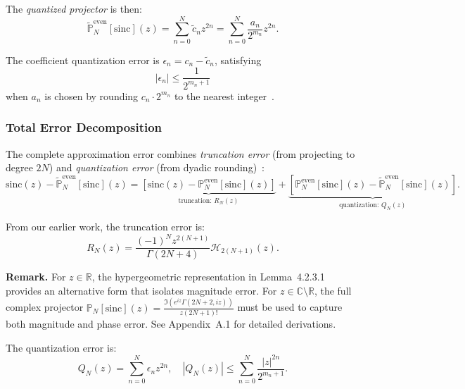 The \emph{quantized projector} is then:
\begin{equation}
\widetilde{\mathbb{P}}_N^{\text{even}}[\mathrm{sinc}](z) = \sum_{n=0}^{N} \widetilde{c}_n z^{2n} = \sum_{n=0}^{N} \frac{a_n}{2^{m_n}} z^{2n}.
\label{eq:quantized_projector}
\end{equation}

The coefficient quantization error is $\epsilon_n = c_n - \widetilde{c}_n$, satisfying
\begin{equation}
|\epsilon_n| \leq \frac{1}{2^{m_n+1}}
\label{eq:dyadic_quant_bound}
\end{equation}
when $a_n$ is chosen by rounding $c_n \cdot 2^{m_n}$ to the nearest integer~\cite{Widrow1996}.

\subsubsection{Total Error Decomposition}

The complete approximation error combines \emph{truncation error} (from projecting to degree $2N$) and \emph{quantization error} (from dyadic rounding)~\cite{Kailath2000}:
\begin{equation}
\mathrm{sinc}(z) - \widetilde{\mathbb{P}}_N^{\text{even}}[\mathrm{sinc}](z) = \underbrace{\left[\mathrm{sinc}(z) - \mathbb{P}_N^{\text{even}}[\mathrm{sinc}](z)\right]}_{\text{truncation: } R_N(z)} + \underbrace{\left[\mathbb{P}_N^{\text{even}}[\mathrm{sinc}](z) - \widetilde{\mathbb{P}}_N^{\text{even}}[\mathrm{sinc}](z)\right]}_{\text{quantization: } Q_N(z)}.
\label{eq:total_error_decomp}
\end{equation}

From our earlier work, the truncation error is:
\begin{equation}
R_N(z) = \frac{(-1)^N z^{2(N+1)}}{\Gamma(2N+4)} \mathcal{H}_{2(N+1)}(z).
\label{eq:truncation_reminder}
\end{equation}

\textbf{Remark.} For $z \in \mathbb{R}$, the hypergeometric representation in Lemma~4.2.3.1 provides an alternative form that isolates magnitude error. For $z \in \mathbb{C} \setminus \mathbb{R}$, the full complex projector $\mathbb{P}_N[\mathrm{sinc}](z) = \frac{\Im(e^{iz}\Gamma(2N+2,iz))}{z(2N+1)!}$ must be used to capture both magnitude and phase error. See Appendix~A.1 for detailed derivations.

The quantization error is:
\begin{equation}
Q_N(z) = \sum_{n=0}^{N} \epsilon_n z^{2n}, \quad |Q_N(z)| \leq \sum_{n=0}^{N} \frac{|z|^{2n}}{2^{m_n+1}}.
\label{eq:quantization_error}
\end{equation}

